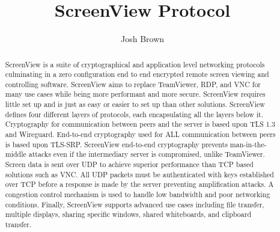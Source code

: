 \documentclass{article}
\title{\textbf{ScreenView Protocol}}
\author{Josh Brown}
\begin{document}
    \maketitle

    \begin{abstract}
        ScreenView is a suite of cryptographical and application level networking protocols culminating in a
        zero configuration end to end encrypted remote screen viewing and controlling software. ScreenView aims to
        replace TeamViewer, RDP, and VNC for many use cases while being more performant and more secure. ScreenView
        requires little set up and is just as easy or easier to set up than other solutions. ScreenView defines four different
        layers of protocols, each encapsulating all the layers below it. Cryptography for communication between peers
        and the server is based upon TLS 1.3 and Wireguard. End-to-end cryptography used for ALL communication between
        peers is based upon TLS-SRP. ScreenView end-to-end cryptography prevents man-in-the-middle attacks even if
        the intermediary server is compromised, unlike TeamViewer. Screen data is sent over UDP to achieve superior
        performance than TCP based solutions such as VNC. All UDP packets must be authenticated with keys established
        over TCP before a response is made by the server preventing amplification attacks. A congestion control
        mechanism is used to handle low bandwidth and poor networking conditions. Finally, ScreenView supports
        advanced use cases including file transfer, multiple displays, sharing specific windows, shared whiteboards,
        and clipboard transfer.
    \end{abstract}

    \newpage

    \tableofcontents
    \newpage

    

    \newpage

    

    

    

    

    
\end{document}
